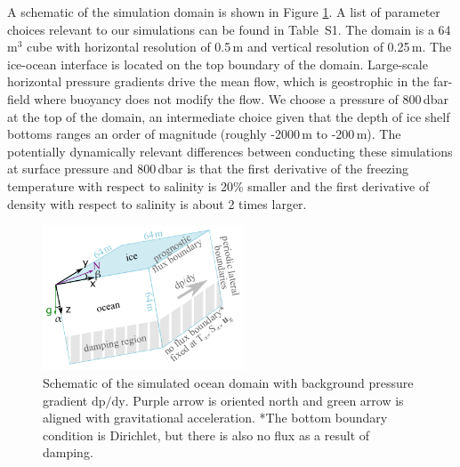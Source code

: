 \documentclass[tc, manuscript]{copernicus}
\begin{document}
A schematic of the simulation domain is shown in Figure \ref{fig:schematic}. A list of parameter choices relevant to our simulations can be found in Table~S1. The domain is a 64 m$^3$ cube with horizontal resolution of 0.5\,\unit{m} and vertical resolution of 0.25\,\unit{m}. The ice-ocean interface is located on the top boundary of the domain. Large-scale horizontal pressure gradients drive the mean flow, which is geostrophic in the far-field where buoyancy does not modify the flow. We choose a pressure of 800\,\unit{dbar} at the top of the domain, an intermediate choice given that the depth of ice shelf bottoms ranges an order of magnitude (roughly -2000\,\unit{m} to -200\,\unit{m}). The potentially dynamically relevant differences between conducting these simulations at surface pressure and 800\,\unit{dbar} is that the first derivative of the freezing temperature with respect to salinity is 20\% smaller and the first derivative of density with respect to salinity is about 2 times larger.

\begin{figure}[t]
\includegraphics[width=6cm]{fig1_schematic.pdf}
\caption{Schematic of the simulated ocean domain with background pressure gradient $\text{dp/dy}$. Purple arrow is oriented north and green arrow is aligned with gravitational acceleration. *The bottom boundary condition is Dirichlet, but there is also no flux as a result of damping. }
\label{fig:schematic}
\end{figure}
\end{document}
